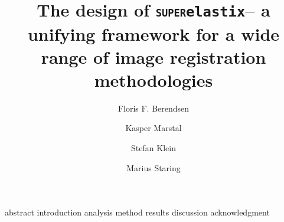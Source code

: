 \documentclass[10pt,twocolumn,letterpaper]{article}
\newcommand{\SuperElastix}{\texttt{\textsc{super}elastix}}
\newcommand{\hide}[1]{}
\begin{document}
\title{The design of \SuperElastix -- a unifying framework for a wide range of image registration methodologies}

\author[1]{Floris F. Berendsen}
\author[2]{Kasper Marstal}
\author[2]{Stefan Klein}
\author[1]{Marius Staring}

\hide{
\author{Floris F. Berendsen\\
{\tt\small f.berendsen@lumc.nl}
\and
Kasper Marstal\\
{\tt\small k.marstal@erasmusmc.nl}
\and Stefan Klein\\
{\tt\small s.klein@erasmusmc.nl}
\and Marius Staring\\
{\tt\small m.staring@lumc.nl}
}
}
\hide{
Division of Image Processing (LKEB), Department of Radiology, Leiden University Medical Center\\
P.O. Box 9600, 2300 RC Leiden, the Netherlands
\and
Biomedical Imaging Group Rotterdam
Erasmus MC, University Medical Center Rotterdam
Departments of Medical Informatics and Radiology\\
P.O. Box 2040, 3000 CA Rotterdam, the Netherlands
}

\maketitle
{abstract}
{introduction}
{analysis}
{method}
{results}
{discussion}
{acknowledgment}

{\small


}
\end{document}
